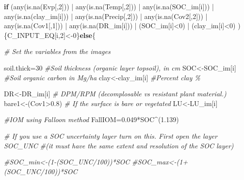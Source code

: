 \documentclass[
  10pt,
  b5paper,
]{book}
\newenvironment{Shaded}{\begin{snugshade}}{\end{snugshade}}
\newcommand{\CommentTok}[1]{\textcolor[rgb]{0.56,0.35,0.01}{\textit{#1}}}
\newcommand{\ControlFlowTok}[1]{\textcolor[rgb]{0.13,0.29,0.53}{\textbf{#1}}}
\newcommand{\DecValTok}[1]{\textcolor[rgb]{0.00,0.00,0.81}{#1}}
\newcommand{\FloatTok}[1]{\textcolor[rgb]{0.00,0.00,0.81}{#1}}
\newcommand{\FunctionTok}[1]{\textcolor[rgb]{0.00,0.00,0.00}{#1}}
\newcommand{\NormalTok}[1]{#1}
\newcommand{\OtherTok}[1]{\textcolor[rgb]{0.56,0.35,0.01}{#1}}
\newcommand{\SpecialCharTok}[1]{\textcolor[rgb]{0.00,0.00,0.00}{#1}}
\begin{document}
\begin{Shaded}
\begin{Highlighting}[]
\ControlFlowTok{if}\NormalTok{ (}\FunctionTok{any}\NormalTok{(}\FunctionTok{is.na}\NormalTok{(Evp[,}\DecValTok{2}\NormalTok{])) }\SpecialCharTok{|} \FunctionTok{any}\NormalTok{(}\FunctionTok{is.na}\NormalTok{(Temp[,}\DecValTok{2}\NormalTok{])) }\SpecialCharTok{|} \FunctionTok{any}\NormalTok{(}\FunctionTok{is.na}\NormalTok{(SOC\_im[i])) }\SpecialCharTok{|} \FunctionTok{any}\NormalTok{(}\FunctionTok{is.na}\NormalTok{(clay\_im[i])) }\SpecialCharTok{|} \FunctionTok{any}\NormalTok{(}\FunctionTok{is.na}\NormalTok{(Precip[,}\DecValTok{2}\NormalTok{]))  }\SpecialCharTok{|}  \FunctionTok{any}\NormalTok{(}\FunctionTok{is.na}\NormalTok{(Cov2[,}\DecValTok{2}\NormalTok{]))  }\SpecialCharTok{|}  \FunctionTok{any}\NormalTok{(}\FunctionTok{is.na}\NormalTok{(Cov1[,}\DecValTok{1}\NormalTok{]))  }\SpecialCharTok{|} \FunctionTok{any}\NormalTok{(}\FunctionTok{is.na}\NormalTok{(DR\_im[i])) }\SpecialCharTok{|}\NormalTok{  (SOC\_im[i]}\SpecialCharTok{\textless{}}\DecValTok{0}\NormalTok{) }\SpecialCharTok{|}\NormalTok{ (clay\_im[i]}\SpecialCharTok{\textless{}}\DecValTok{0}\NormalTok{) ) \{C\_INPUT\_EQ[i,}\DecValTok{2}\NormalTok{]}\OtherTok{\textless{}{-}}\DecValTok{0}\NormalTok{\}}\ControlFlowTok{else}\NormalTok{\{}

\CommentTok{\# Set the variables from the images}

\NormalTok{soil.thick}\OtherTok{=}\DecValTok{30}  \CommentTok{\#Soil thickness (organic layer topsoil), in cm}
\NormalTok{SOC}\OtherTok{\textless{}{-}}\NormalTok{SOC\_im[i]      }\CommentTok{\#Soil organic carbon in Mg/ha }
\NormalTok{clay}\OtherTok{\textless{}{-}}\NormalTok{clay\_im[i]        }\CommentTok{\#Percent clay \%}

\NormalTok{DR}\OtherTok{\textless{}{-}}\NormalTok{DR\_im[i]              }\CommentTok{\# DPM/RPM (decomplosable vs resistant plant material.)}
\NormalTok{bare1}\OtherTok{\textless{}{-}}\NormalTok{(Cov1}\SpecialCharTok{\textgreater{}}\FloatTok{0.8}\NormalTok{)           }\CommentTok{\# If the surface is bare or vegetated}
\NormalTok{LU}\OtherTok{\textless{}{-}}\NormalTok{LU\_im[i]}

\CommentTok{\#IOM using Falloon method}
\NormalTok{FallIOM}\OtherTok{=}\FloatTok{0.049}\SpecialCharTok{*}\NormalTok{SOC}\SpecialCharTok{\^{}}\NormalTok{(}\FloatTok{1.139}\NormalTok{) }

\CommentTok{\# If you use a SOC uncertainty layer turn on this. First open the layer SOC\_UNC }
\CommentTok{\#(it must have the same extent and resolution of the SOC layer)}

\CommentTok{\#SOC\_min\textless{}{-}(1{-}(SOC\_UNC/100))*SOC}
\CommentTok{\#SOC\_max\textless{}{-}(1+(SOC\_UNC/100))*SOC}


\end{Highlighting}
\end{Shaded}
\end{document}
